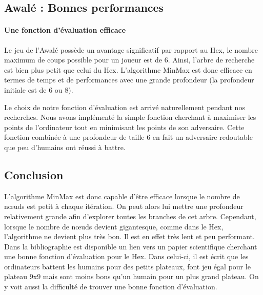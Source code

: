 


\subsection{Awalé : Bonnes performances}
\paragraph{Une fonction d'évaluation efficace} 
Le jeu de l'Awalé possède un avantage significatif par rapport au Hex, le nombre maximum de coups
possible pour un joueur est de 6. Ainsi, l'arbre de recherche est bien plus petit que celui du Hex. L'algorithme MinMax est donc efficace en termes de
temps et de performances avec une grande profondeur (la profondeur initiale est de 6 ou 8).

Le choix de notre fonction d'évaluation est arrivé naturellement pendant nos recherches. Nous avons implémenté la simple fonction cherchant à
maximiser les points de l'ordinateur tout en minimisant les points de son adversaire. Cette fonction combinée à une profondeur de taille 6 en fait un
adversaire redoutable que peu d'humains ont réussi à battre.

\subsection{Conclusion}
L'algorithme MinMax est donc capable d'être efficace lorsque le nombre de nœuds est petit à chaque itération. On peut alors
lui mettre une profondeur relativement grande afin d'explorer toutes les branches de cet arbre.
Cependant, lorsque le nombre de nœuds devient gigantesque, comme dans le Hex, l'algorithme ne devient plus très bon. Il est en effet très lent et peu performant.
Dans la bibliographie est disponible un lien vers un papier scientifique cherchant une bonne fonction d'évaluation pour le Hex.
Dans celui-ci, il est écrit que les ordinateurs battent les humains pour des petits plateaux, font jeu égal pour le plateau 9x9 mais
sont moins bons qu'un humain pour un plus grand plateau. On y voit aussi la difficulté de trouver une bonne fonction d'évaluation.
